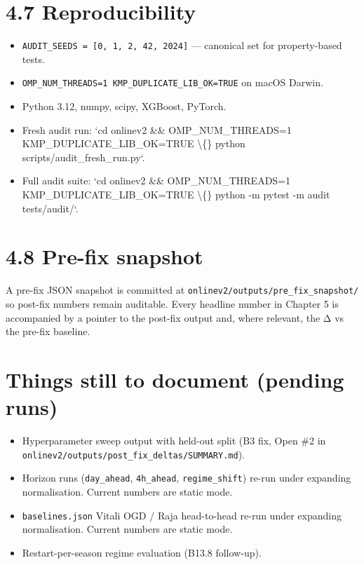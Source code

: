 \documentclass[11pt,a4paper,openany]{report}
\begin{document}
\section{4.7 Reproducibility}

\begin{itemize}
  \item \texttt{AUDIT\_SEEDS = [0, 1, 2, 42, 2024]} — canonical set for property-based
    tests.
  \item \texttt{OMP\_NUM\_THREADS=1 KMP\_DUPLICATE\_LIB\_OK=TRUE} on macOS Darwin.
  \item Python 3.12, numpy, scipy, XGBoost, PyTorch.
  \item Fresh audit run:
    `cd onlinev2 \&\& OMP\_NUM\_THREADS=1 KMP\_DUPLICATE\_LIB\_OK=TRUE \textbackslash\{\}
    python scripts/audit\_fresh\_run.py`.
  \item Full audit suite:
    `cd onlinev2 \&\& OMP\_NUM\_THREADS=1 KMP\_DUPLICATE\_LIB\_OK=TRUE \textbackslash\{\}
    python -m pytest -m audit tests/audit/`.
\end{itemize}

\section{4.8 Pre-fix snapshot}

A pre-fix JSON snapshot is committed at
\texttt{onlinev2/outputs/pre\_fix\_snapshot/} so post-fix numbers remain
auditable. Every headline number in Chapter 5 is accompanied by a
pointer to the post-fix output and, where relevant, the Δ vs the
pre-fix baseline.

\section{Things still to document (pending runs)}

\begin{itemize}
  \item [PENDING] Hyperparameter sweep output with held-out split (B3 fix,
    Open \#2 in \texttt{onlinev2/outputs/post\_fix\_deltas/SUMMARY.md}).
  \item [PENDING] Horizon runs (\texttt{day\_ahead}, \texttt{4h\_ahead}, \texttt{regime\_shift})
    re-run under expanding normalisation. Current numbers are static
    mode.
  \item [PENDING] \texttt{baselines.json} Vitali OGD / Raja head-to-head re-run
    under expanding normalisation. Current numbers are static mode.
  \item [PENDING] Restart-per-season regime evaluation (B13.8 follow-up).
\end{itemize}
\end{document}

